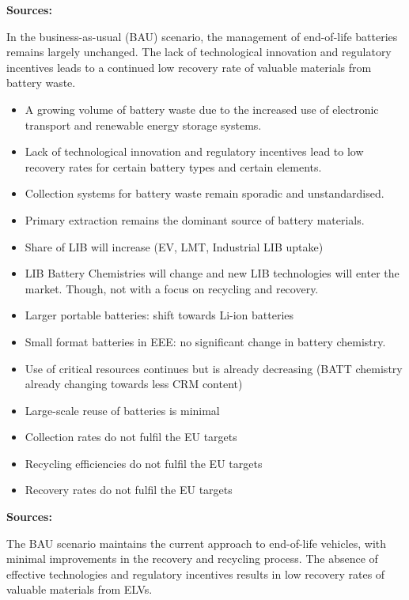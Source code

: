 \wasteSubsubsecBATT 
\textbf{Sources:}~\cite{helander2023battelv, eu2020batt, halleux2021batt, eu2023batt}

In the business-as-usual (BAU) scenario, the management of end-of-life batteries remains largely unchanged. The lack of technological innovation and regulatory incentives leads to a continued low recovery rate of valuable materials from battery waste.

\begin{itemize}
  \item A growing volume of battery waste due to the increased use of electronic transport and renewable energy storage systems.
  \item Lack of technological innovation and regulatory incentives lead to low recovery rates for certain battery types and certain elements.
  \item Collection systems for battery waste remain sporadic and unstandardised.
  \item Primary extraction remains the dominant source of battery materials.
  \item Share of LIB will increase (EV, LMT, Industrial LIB uptake)
  \item LIB Battery Chemistries will change and new LIB technologies will enter the market. Though, not with a focus on recycling and recovery.
  \item Larger portable batteries: shift towards Li-ion batteries
  \item Small format batteries in EEE: no significant change in battery chemistry.
  \item Use of critical resources continues but is already decreasing (BATT chemistry already changing towards less CRM content)
  \item Large-scale reuse of batteries is minimal
  \item Collection rates do not fulfil the EU targets
  \item Recycling efficiencies do not fulfil the EU targets
  \item Recovery rates do not fulfil the EU targets
\end{itemize}



\wasteSubsubsecELV
\textbf{Sources:}~\cite{eu2023elv,lovik2021elv, tazi2023elv,helander2023battelv,ljunggren2022elv,iea2023evoutlook}

The BAU scenario maintains the current approach to end-of-life vehicles, with minimal improvements in the recovery and recycling process. The absence of effective technologies and regulatory incentives results in low recovery rates of valuable materials from ELVs.


